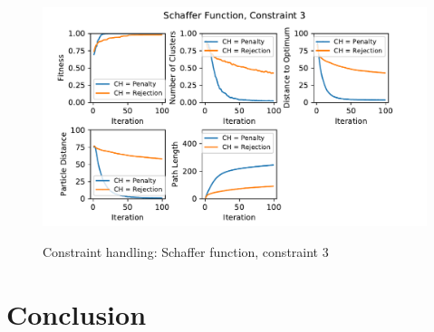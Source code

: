 \documentclass[12pt]{article}
\begin{document}
\begin{figure}
	\centering
	\includegraphics[width=1\textwidth]{figures/ex6/ex6-1-Constraint_3.pdf}
	\label{fig:ex6-1-1}
	\caption{Constraint handling: Schaffer function, constraint 3}
\end{figure}

\section{Conclusion}





\end{document}
